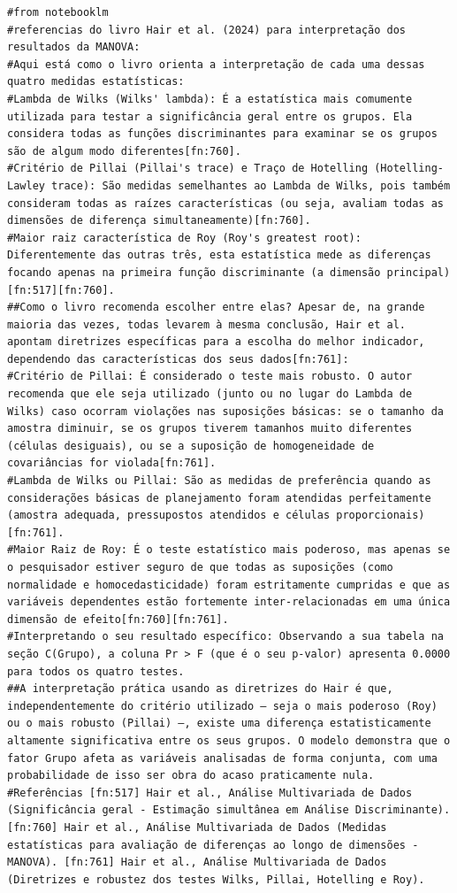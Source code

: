 \documentclass[11pt]{article}
\begin{document}
\begin{verbatim}
#from notebooklm
#referencias do livro Hair et al. (2024) para interpretação dos resultados da MANOVA:
#Aqui está como o livro orienta a interpretação de cada uma dessas quatro medidas estatísticas:
#Lambda de Wilks (Wilks' lambda): É a estatística mais comumente utilizada para testar a significância geral entre os grupos. Ela considera todas as funções discriminantes para examinar se os grupos são de algum modo diferentes[fn:760].
#Critério de Pillai (Pillai's trace) e Traço de Hotelling (Hotelling-Lawley trace): São medidas semelhantes ao Lambda de Wilks, pois também consideram todas as raízes características (ou seja, avaliam todas as dimensões de diferença simultaneamente)[fn:760].
#Maior raiz característica de Roy (Roy's greatest root): Diferentemente das outras três, esta estatística mede as diferenças focando apenas na primeira função discriminante (a dimensão principal)[fn:517][fn:760].
##Como o livro recomenda escolher entre elas? Apesar de, na grande maioria das vezes, todas levarem à mesma conclusão, Hair et al. apontam diretrizes específicas para a escolha do melhor indicador, dependendo das características dos seus dados[fn:761]:
#Critério de Pillai: É considerado o teste mais robusto. O autor recomenda que ele seja utilizado (junto ou no lugar do Lambda de Wilks) caso ocorram violações nas suposições básicas: se o tamanho da amostra diminuir, se os grupos tiverem tamanhos muito diferentes (células desiguais), ou se a suposição de homogeneidade de covariâncias for violada[fn:761].
#Lambda de Wilks ou Pillai: São as medidas de preferência quando as considerações básicas de planejamento foram atendidas perfeitamente (amostra adequada, pressupostos atendidos e células proporcionais)[fn:761].
#Maior Raiz de Roy: É o teste estatístico mais poderoso, mas apenas se o pesquisador estiver seguro de que todas as suposições (como normalidade e homocedasticidade) foram estritamente cumpridas e que as variáveis dependentes estão fortemente inter-relacionadas em uma única dimensão de efeito[fn:760][fn:761].
#Interpretando o seu resultado específico: Observando a sua tabela na seção C(Grupo), a coluna Pr > F (que é o seu p-valor) apresenta 0.0000 para todos os quatro testes.
##A interpretação prática usando as diretrizes do Hair é que, independentemente do critério utilizado — seja o mais poderoso (Roy) ou o mais robusto (Pillai) —, existe uma diferença estatisticamente altamente significativa entre os seus grupos. O modelo demonstra que o fator Grupo afeta as variáveis analisadas de forma conjunta, com uma probabilidade de isso ser obra do acaso praticamente nula.
#Referências [fn:517] Hair et al., Análise Multivariada de Dados (Significância geral - Estimação simultânea em Análise Discriminante). [fn:760] Hair et al., Análise Multivariada de Dados (Medidas estatísticas para avaliação de diferenças ao longo de dimensões - MANOVA). [fn:761] Hair et al., Análise Multivariada de Dados (Diretrizes e robustez dos testes Wilks, Pillai, Hotelling e Roy).
\end{verbatim}
\end{document}

